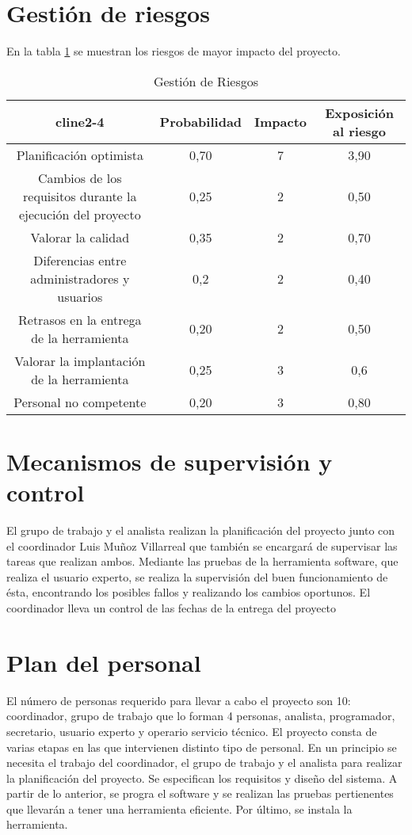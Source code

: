 \documentclass[11pt,a4paper,spanish,twoside]{report}
\begin{document}
\section{Gestión de riesgos}
En la tabla \ref{Tab:GestRi} se muestran los riesgos de mayor impacto del
proyecto. 
\begin{table}[!h]
\centering
\small
  \begin{tabular}{c|c|c|c}
    cline{2-4}
    & \textbf{Probabilidad} & \textbf{Impacto} &
    \textbf{Exposición al riesgo} \\
    \hline \hline
    Planificación optimista & 0,70 & 7 & 3,90 \\
    Cambios de los requisitos durante la ejecución del proyecto & 0,25 & 2 &
    0,50 \\
    Valorar la calidad & 0,35 & 2 & 0,70 \\
    Diferencias entre administradores y usuarios & 0,2 & 2 & 0,40 \\
    Retrasos en la entrega de la herramienta & 0,20 & 2 & 0,50 \\
    Valorar la implantación de la herramienta & 0,25 & 3 & 0,6 \\
    Personal no competente & 0,20 & 3 & 0,80 \\
  \end{tabular}
  \caption{Gestión de Riesgos} \label{Tab:GestRi}
\end{table}

\section{Mecanismos de supervisión y control}
El grupo de trabajo y el analista realizan la planificación del proyecto
junto con el coordinador Luis Muñoz Villarreal que también se encargará de
supervisar las tareas que realizan ambos.
Mediante las pruebas de la herramienta software, que realiza el usuario
experto, se realiza la supervisión del buen funcionamiento de ésta,
encontrando los posibles fallos y realizando los cambios oportunos. 
El coordinador lleva un control de las fechas de la entrega del proyecto
\section{Plan del personal}
El número de personas requerido para llevar a cabo el proyecto son 10:
coordinador, grupo de trabajo que lo forman 4 personas, analista,
programador, secretario, usuario experto y operario servicio técnico. 
El proyecto consta de varias etapas en las que intervienen distinto tipo de
personal. En un principio se necesita el trabajo del coordinador, el grupo
de trabajo y el analista para realizar la planificación del proyecto. Se
especifican los requisitos y diseño del sistema. A partir de lo anterior, se
progra el software y se realizan las pruebas pertienentes que llevarán a
tener una herramienta eficiente. Por último, se instala la herramienta.
\end{document}
